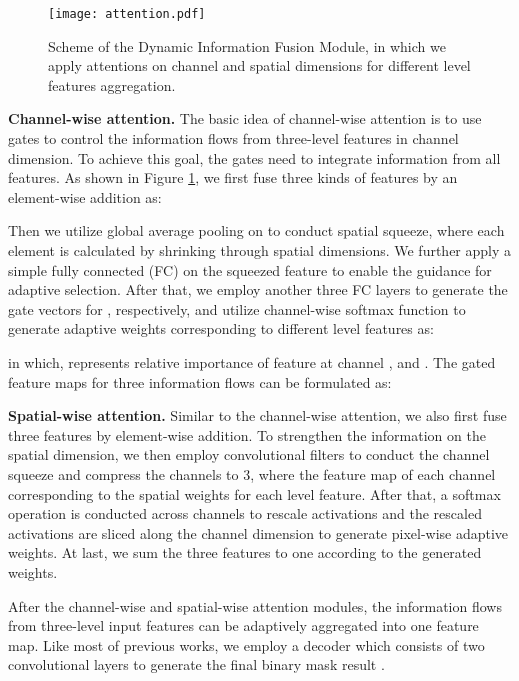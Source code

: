 \documentclass[letterpaper]{article} \usepackage{aaai20}  \usepackage{times}  \usepackage{helvet} \usepackage{courier}  \usepackage[hyphens]{url}  \usepackage{graphicx} \urlstyle{rm} \def\UrlFont{\rm}  \usepackage{graphicx}  \frenchspacing  \setlength{\pdfpagewidth}{8.5in}  \setlength{\pdfpageheight}{11in}  \usepackage{amssymb}
\begin{document}
\begin{figure}[t!]
\centering
\texttt{[image: attention.pdf]}
\caption{Scheme of the Dynamic Information Fusion Module, in which we apply attentions on channel and spatial dimensions for different level features aggregation.}
\label{fig:attention}
\vspace{-12pt}
\end{figure}

\noindent \textbf{Channel-wise attention.}
The basic idea of channel-wise attention is to use gates to control the information flows from three-level features in channel dimension. To achieve this goal, the gates need to integrate information from all features. As shown in Figure \ref{fig:attention}, we first fuse three kinds of features by an element-wise addition as:

Then we utilize global average pooling on  to conduct spatial squeeze, where each element is calculated by shrinking  through spatial dimensions. We further apply a simple fully connected (FC) on the squeezed feature to enable the guidance for adaptive selection. After that, we employ another three FC layers to generate the gate vectors  for , respectively, and utilize
channel-wise softmax function to generate adaptive weights  corresponding to different level features  as:

in which,  represents relative importance of feature  at channel , and .
The gated feature maps for three information flows can be formulated as:


\noindent \textbf{Spatial-wise attention.} Similar to the channel-wise attention, we also first fuse three features by element-wise addition. To strengthen the information on the spatial dimension, we then employ  convolutional filters to conduct the channel squeeze and compress the channels to 3, where the feature map of each channel corresponding to the spatial weights for each level feature. After that, a softmax operation is conducted across channels to rescale activations and the rescaled activations are sliced along the channel dimension to generate pixel-wise adaptive weights. At last, we sum the three features to one according to the generated weights.

After the channel-wise and spatial-wise attention modules, the information flows from three-level input features can be adaptively aggregated into one feature map. Like most of previous works, we employ a decoder which consists of two convolutional layers to generate the final binary mask result .
\end{document}
